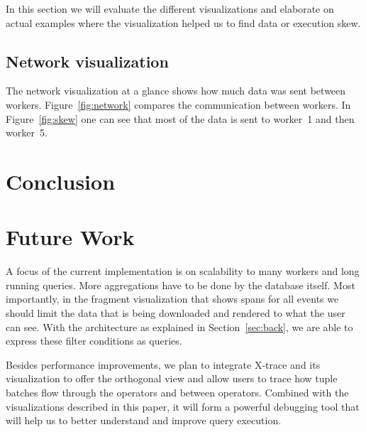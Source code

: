 \documentclass{chi2009}
\begin{document}
In this section we will evaluate the different visualizations and elaborate on actual examples where the visualization helped us to find data or execution skew.



\subsection{Network visualization}

The network visualization at a glance shows how much data was sent between workers. Figure~\ref{fig:network} compares the communication between workers. In Figure~\ref{fig:skew} one can see that most of the data is sent to worker~1 and then worker~5.

\section{Conclusion}



\section{Future Work}

A focus of the current implementation is on scalability to many workers and long running queries. More aggregations have to be done by the database itself. Most importantly, in the fragment visualization that shows spans for all events we should limit the data that is being downloaded and rendered to what the user can see. With the architecture as explained in Section~\ref{sec:back}, we are able to express these filter conditions as queries.

Besides performance improvements, we plan to integrate X-trace and its visualization to offer the orthogonal view and allow users to trace how tuple batches flow through the operators and between operators. Combined with the visualizations described in this paper, it will form a powerful debugging tool that will help us to better understand and improve query execution.



\end{document}

